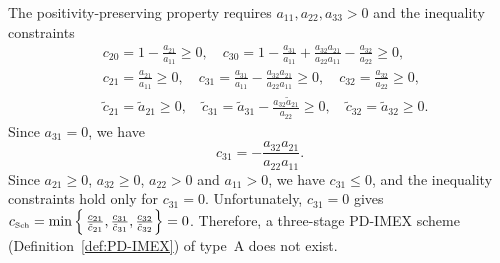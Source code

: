 The positivity-preserving property requires $a_{11}, a_{22}, a_{33}>0$ and the inequality constraints
\begin{align*}
  & c_{20} = 1 - \frac{a_{21}}{a_{11}} \geq 0, \quad c_{30} = 1-\frac{a_{31}}{a_{11}} + \frac{a_{32}a_{21}}{a_{22}a_{11}} - \frac{a_{32}}{a_{22}}\geq 0, \\
  & c_{21} = \frac{a_{21}}{a_{11}} \geq 0, \quad c_{31} = \frac{a_{31}}{a_{11}} - \frac{a_{32}a_{21}}{a_{22}a_{11}} \geq 0, \quad c_{32} = \frac{a_{32}}{a_{22}} \geq 0,\\
  & \tilde{c}_{21} = \tilde{a}_{21} \geq 0, \quad \tilde{c}_{31} = \tilde{a}_{31} - \frac{a_{32}\tilde{a}_{21}}{a_{22}} \geq 0, \quad \tilde{c}_{32} = \tilde{a}_{32} \geq 0.
\end{align*}
Since $a_{31} = 0$, we have
\begin{equation*}
  c_{31} = - \frac{a_{32}a_{21}}{a_{22}a_{11}}.  
\end{equation*}
Since $a_{21} \geq 0$, $a_{32} \geq 0$, $a_{22} > 0$ and $a_{11} >0$, we have $c_{31} \leq 0$, and the inequality constraints hold only for $c_{31} = 0$.
Unfortunately, $c_{31} = 0$ gives $c_{\mbox{\tiny Sch}} = \min \Big\{\,\frac{c_{21}}{\tilde{c}_{21}}, \frac{c_{31}}{\tilde{c}_{31}}, \frac{c_{32}}{\tilde{c}_{32}}\Big\} = 0$.
Therefore, a three-stage PD-IMEX scheme (Definition~\ref{def:PD-IMEX}) of type~A does not exist.
